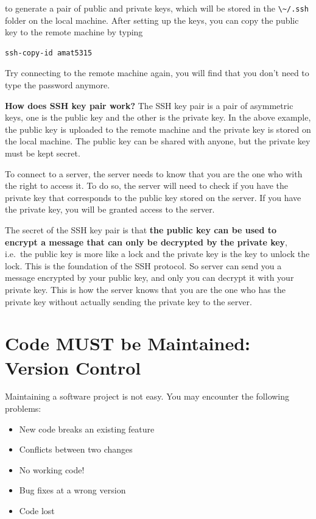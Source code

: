 \documentclass[
  notoc %
]{tufte-book}
\providecommand{\tightlist}{%
  \setlength{\itemsep}{0pt}\setlength{\parskip}{0pt}
}
\newcommand{\passthrough}[1]{#1}
\begin{document}
to generate a pair of public and private keys, which will be stored in
the \passthrough{\lstinline!\~/.ssh!} folder on the local machine. After
setting up the keys, you can copy the public key to the remote machine
by typing

\begin{lstlisting}[language=bash]
ssh-copy-id amat5315
\end{lstlisting}

Try connecting to the remote machine again, you will find that you don't
need to type the password anymore.

\textbf{How does SSH key pair work?} The SSH key pair is a pair of
asymmetric keys, one is the public key and the other is the private key.
In the above example, the public key is uploaded to the remote machine
and the private key is stored on the local machine. The public key can
be shared with anyone, but the private key must be kept secret.

To connect to a server, the server needs to know that you are the one
who with the right to access it. To do so, the server will need to check
if you have the private key that corresponds to the public key stored on
the server. If you have the private key, you will be granted access to
the server.

The secret of the SSH key pair is that \textbf{the public key can be
used to encrypt a message that can only be decrypted by the private
key}, i.e.~the public key is more like a lock and the private key is the
key to unlock the lock. This is the foundation of the SSH protocol. So
server can send you a message encrypted by your public key, and only you
can decrypt it with your private key. This is how the server knows that
you are the one who has the private key without actually sending the
private key to the server.

\hypertarget{sec:version-control}{%
\section{Code MUST be Maintained: Version
Control}\label{sec:version-control}}

Maintaining a software project is not easy. You may encounter the
following problems:

\begin{itemize}
\tightlist
\item
  New code breaks an existing feature
\item
  Conflicts between two changes
\item
  No working code!
\item
  Bug fixes at a wrong version
\item
  Code lost
\end{itemize}
\end{document}

